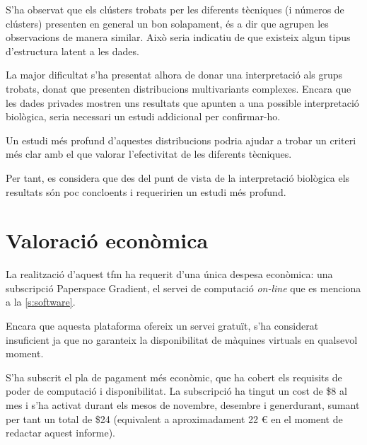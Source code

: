 \documentclass[CAT,BIB]{TFUOC}%
\begin{document}
        S'ha observat que els clústers trobats per les diferents tècniques
        (i números de clústers)
        presenten en general un bon solapament,
        és a dir que agrupen les observacions de manera similar.
        Això seria indicatiu de que existeix algun tipus d'estructura latent a les dades.

        La major dificultat s'ha presentat
        alhora de donar una interpretació als grups trobats,
        donat que presenten distribucions multivariants complexes.
        Encara que les dades \gls{privades} mostren
        uns resultats que apunten a una possible interpretació biològica,
        seria necessari un estudi addicional per confirmar-ho.

        Un estudi més profund d'aquestes distribucions
        podria ajudar a trobar un criteri més clar
        amb el que valorar l'efectivitat de les diferents tècniques.

        Per tant,
        es considera que des del punt de vista de la interpretació biològica
        els resultats són poc concloents
        i requeririen un estudi més profund.



\chapter{Valoració econòmica}
\label{c:economic}

    La realització d'aquest \gls{tfm} ha requerit d'una única despesa econòmica:
    una subscripció Paperspace Gradient,
    el servei de computació \textit{on-line}
    que es menciona a la \cref{s:software}.

    Encara que aquesta plataforma ofereix un servei gratuït,
    s'ha considerat insuficient
    ja que no garanteix la disponibilitat de màquines virtuals en qualsevol moment.

    S'ha subscrit el pla de pagament més econòmic,
    que ha cobert els requisits de poder de computació
    i disponibilitat.
    La subscripció ha tingut un cost de \$8 al mes
    i s'ha activat durant els mesos de novembre, desembre i generdurant,
    sumant per tant un total de \$24
    (equivalent a aproximadament 22 € en el moment de redactar aquest informe).
\end{document}
